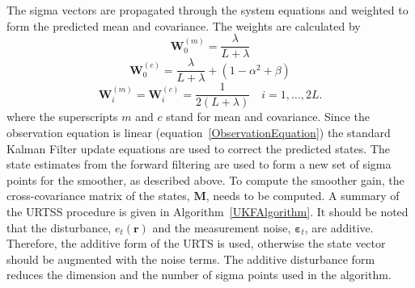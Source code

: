 \documentclass[twocolumn,11pt,a4paper]{article}		%
\begin{document}
The sigma vectors are propagated through the system equations and weighted to form the predicted mean and covariance. The weights are calculated by 
\begin{equation}
	\mathbf W_0^{(m)}=\frac{\lambda}{ L+\lambda} 
\end{equation}
\begin{equation}
	\mathbf W_0^{(c)}=\frac{\lambda}{ L+\lambda}+(1-\alpha^2+\beta) 
\end{equation}
\begin{equation}
	\mathbf W_i^{(m)}=\mathbf W_i^{(c)}=\frac{1}{2( L+\lambda)} \quad i=1, \dots, 2L. 
\end{equation}
where the superscripts $m$ and $c$ stand for mean and covariance. Since the observation equation is linear (equation~\ref{ObservationEquation}) the standard Kalman Filter update equations are  used to correct the predicted states. The state estimates from the forward filtering are used to form a new set of sigma points for the smoother, as described above. To compute the smoother gain, the cross-covariance matrix of the states, $\mathbf M$, needs to be computed. A summary of the URTSS procedure is given in Algorithm~\ref{UKFAlgorithm}. It should be noted that  the disturbance, $e_t\left(\mathbf{r}\right)$ and the measurement noise, $\boldsymbol{\varepsilon}_t$, are additive. Therefore, the additive form of the URTS is used, otherwise the state vector should be augmented with the noise terms. The additive disturbance form reduces the dimension and the number of sigma points used in the algorithm.
\end{document}
